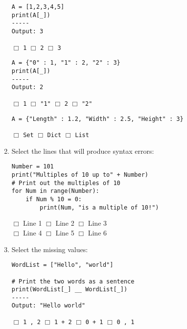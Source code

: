 \documentclass[11pt]{report}
\begin{document}
\begin{enumerate}
\begin{verbatim}
A = [1,2,3,4,5]
print(A[_])
-----
Output: 3
\end{verbatim}
$\Box$ {\tt 1} \hspace{2em} $\Box$ {\tt 2} \hspace{2em} $\Box$ {\tt 3}

\begin{verbatim}
A = {"0" : 1, "1" : 2, "2" : 3}
print(A[_])
-----
Output: 2
\end{verbatim}
$\Box$ {\tt 1} \hspace{2em} $\Box$ {\tt "1"} \hspace{2em} $\Box$ {\tt 2} \hspace{2em} $\Box$ {\tt "2"}

\begin{verbatim}
A = {"Length" : 1.2, "Width" : 2.5, "Height" : 3}
\end{verbatim}
$\Box$ {\tt Set} \hspace{2em} $\Box$ {\tt Dict} \hspace{2em} $\Box$ {\tt List}

\item Select the lines that will produce syntax errors:

\begin{verbatim}
Number = 101
print("Multiples of 10 up to" + Number)
# Print out the multiples of 10
for Num in range(Number):
    if Num % 10 = 0:
        print(Num, "is a multiple of 10!")
\end{verbatim}
$\Box$ Line 1 \hspace{3em} $\Box$ Line 2 \hspace{3em} $\Box$ Line 3\\
$\Box$ Line 4 \hspace{3em} $\Box$ Line 5 \hspace{3em} $\Box$ Line 6

\item Select the missing values:

\begin{verbatim}
WordList = ["Hello", "world"]

# Print the two words as a sentence
print(WordList[_] __ WordList[_])
-----
Output: "Hello world"
\end{verbatim}
$\Box$ {\tt 1 , 2} \hspace{2em} $\Box$ {\tt 1 + 2} \hspace{2em} $\Box$ {\tt 0 + 1} \hspace{2em} $\Box$ {\tt 0 , 1}


\end{enumerate}
\end{document}
